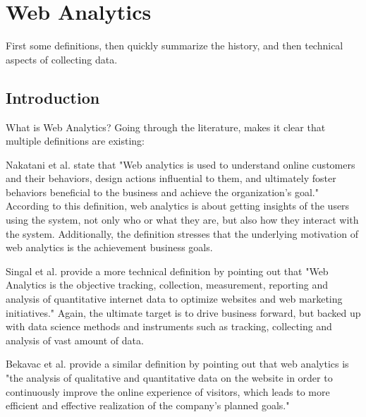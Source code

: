 






\section{Web Analytics}

First some definitions, then quickly summarize the history, and then technical aspects of collecting data.


\subsection{Introduction}

What is Web Analytics?
Going through the literature, makes it clear that multiple definitions are existing:

Nakatani et al. state that "Web analytics is used to understand online customers and their behaviors, design actions influential to them, and ultimately foster behaviors beneficial to the business and achieve the organization's goal." %
According to this definition, web analytics is about getting insights of the users using the system, not only who or what they are, but also how they interact with the system.
Additionally, the definition stresses that the underlying motivation of web analytics is the achievement business goals.

Singal et al. provide a more technical definition by pointing out that "Web Analytics is the objective tracking, collection, measurement, reporting and analysis of quantitative internet data to optimize websites and web marketing initiatives." %
Again, the ultimate target is to drive business forward, but backed up with data science methods and instruments such as tracking, collecting and analysis of vast amount of data.

Bekavac et al. provide a similar definition by pointing out that web analytics is "the analysis of qualitative and quantitative data on the website in order to continuously improve the online experience of visitors, which leads to more efficient and effective realization of the company's planned goals." %

